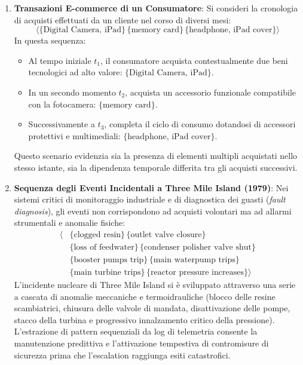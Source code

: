 \begin{enumerate}[label=\textbf{\arabic*.}]
    \item \textbf{Transazioni E-commerce di un Consumatore}:
    Si consideri la cronologia di acquisti effettuati da un cliente nel corso di diversi mesi:
    \begin{equation}
    \label{eq:seq-example-ecommerce}
    \langle \{\text{Digital Camera, iPad}\} \, \{\text{memory card}\} \, \{\text{headphone, iPad cover}\} \rangle
    \end{equation}
    In questa sequenza:
    \begin{itemize}[noitemsep]
        \item Al tempo iniziale $t_1$, il consumatore acquista contestualmente due beni tecnologici ad alto valore: $\{\text{Digital Camera, iPad}\}$.
        \item In un secondo momento $t_2$, acquista un accessorio funzionale compatibile con la fotocamera: $\{\text{memory card}\}$.
        \item Successivamente a $t_3$, completa il ciclo di consumo dotandosi di accessori protettivi e multimediali: $\{\text{headphone, iPad cover}\}$.
    \end{itemize}
    Questo scenario evidenzia sia la presenza di elementi multipli acquistati nello stesso istante, sia la dipendenza temporale differita tra gli acquisti successivi.

    \item \textbf{Sequenza degli Eventi Incidentali a Three Mile Island (1979)}:
    Nei sistemi critici di monitoraggio industriale e di diagnostica dei guasti (\textit{fault diagnosis}), gli eventi non corrispondono ad acquisti volontari ma ad allarmi strumentali e anomalie fisiche:
    \begin{align}
    \label{eq:seq-example-tmi}
    \langle &\{\text{clogged resin}\} \, \{\text{outlet valve closure}\} \nonumber \\
    &\{\text{loss of feedwater}\} \, \{\text{condenser polisher valve shut}\} \nonumber \\
    &\{\text{booster pumps trip}\} \, \{\text{main waterpump trips}\} \nonumber \\
    &\{\text{main turbine trips}\} \, \{\text{reactor pressure increases}\} \rangle
    \end{align}
    L'incidente nucleare di Three Mile Island si è sviluppato attraverso una serie a cascata di anomalie meccaniche e termoidrauliche (blocco delle resine scambiatrici, chiusura delle valvole di mandata, disattivazione delle pompe, stacco della turbina e progressivo innalzamento critico della pressione). L'estrazione di pattern sequenziali da log di telemetria consente la manutenzione predittiva e l'attivazione tempestiva di contromisure di sicurezza prima che l'escalation raggiunga esiti catastrofici.


\end{enumerate}
